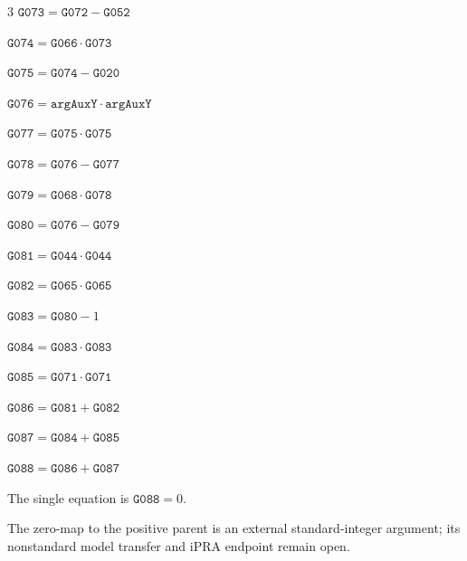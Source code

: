 \documentclass[10pt]{article}
\begin{document}
\begin{multicols}{3}
\noindent $\mathtt{G073}=\mathtt{G072}-\mathtt{G052}$\par
\noindent $\mathtt{G074}=\mathtt{G066}\cdot \mathtt{G073}$\par
\noindent $\mathtt{G075}=\mathtt{G074}-\mathtt{G020}$\par
\noindent $\mathtt{G076}=\mathtt{argAuxY}\cdot \mathtt{argAuxY}$\par
\noindent $\mathtt{G077}=\mathtt{G075}\cdot \mathtt{G075}$\par
\noindent $\mathtt{G078}=\mathtt{G076}-\mathtt{G077}$\par
\noindent $\mathtt{G079}=\mathtt{G068}\cdot \mathtt{G078}$\par
\noindent $\mathtt{G080}=\mathtt{G076}-\mathtt{G079}$\par
\noindent $\mathtt{G081}=\mathtt{G044}\cdot \mathtt{G044}$\par
\noindent $\mathtt{G082}=\mathtt{G065}\cdot \mathtt{G065}$\par
\noindent $\mathtt{G083}=\mathtt{G080}-1$\par
\noindent $\mathtt{G084}=\mathtt{G083}\cdot \mathtt{G083}$\par
\noindent $\mathtt{G085}=\mathtt{G071}\cdot \mathtt{G071}$\par
\noindent $\mathtt{G086}=\mathtt{G081}+\mathtt{G082}$\par
\noindent $\mathtt{G087}=\mathtt{G084}+\mathtt{G085}$\par
\noindent $\mathtt{G088}=\mathtt{G086}+\mathtt{G087}$\par
\end{multicols}
The single equation is $\boxed{\mathtt{G088}=0}$.
\par\small The zero-map to the positive parent is an external standard-integer argument; its nonstandard model transfer and iPRA endpoint remain open.
\end{document}
